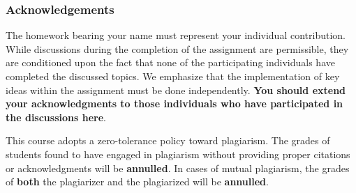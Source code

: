 \documentclass[a4paper]{article}
\numberwithin{equation}{section}
\theoremstyle{definition}
\theoremstyle{definition}
\begin{document}
\newpage
\subsubsection*{Acknowledgements}
The homework bearing your name must represent your individual contribution. While discussions during the completion of the assignment are permissible, they are conditioned upon the fact that none of the participating individuals have completed the discussed topics. We emphasize that the implementation of key ideas within the assignment must be done independently. \textbf{\color{red}You should extend your acknowledgments to those individuals who have participated in the discussions here}.

This course adopts a zero-tolerance policy toward plagiarism. The grades of students found to have engaged in plagiarism without providing proper citations or acknowledgments will be \textbf{{\color{red}annulled}}. In cases of mutual plagiarism, the grades of \textbf{{\color{red}both}} the plagiarizer and the plagiarized will be \textbf{{\color{red}annulled}}. 
\end{document}
